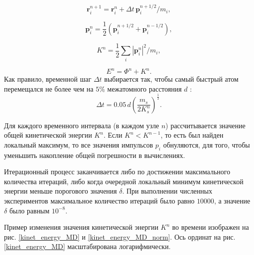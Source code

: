 \begin{equation}
\label{LF2}
\mathbf{r}^{n+1}_i = \mathbf{r}^{n}_i + \Delta t \, \mathbf{p}^{n+1/2}_i/m_i,
\end{equation}

\begin{equation}
\label{LF3}
\mathbf{p}^{n}_i = \dfrac{1}{2} \left(\mathbf{p}^{n+1/2}_i +
\mathbf{p}^{n-1/2}_i \right),
\end{equation}

\begin{equation}
\label{LF4}
K^n = \dfrac{1}{2} \sum_{i} |\mathbf{p}^{n}_i|^2/m_i,
\end{equation}

\begin{equation}
\label{LF5}
E^n = {\Phi}^n + K^n .
\end{equation}
Как правило, временной шаг $\Delta t$ выбирается так, чтобы самый быстрый атом перемещался не более чем на $5\%$
межатомного расстояния $d$ \cite{Eckstein1991}:
\begin{equation}
\label{LF6}
\Delta t = 0.05 \, d \left( \dfrac{m_s}{2 K_s^n} \right)^{\frac{1}{2}}.
\end{equation}

Для каждого временного интервала (в каждом узле $n$) рассчитывается значение общей кинетической энергии $K^n$.
Если $K^n < K^{n-1}$, то есть был найден локальный максимум,
то все значения импульсов $p_{i}$ обнуляются, для того, чтобы уменьшить накопление общей погрешности в вычислениях.

Итерационный процесс заканчивается либо по достижении максимального количества итераций,
либо когда очередной локальный минимум кинетической энергии меньше порогового значения $\delta$.
При выполнении численных экспериментов максимальное количество итераций было равно $10000$,
а значение $\delta$ было равным $10^{-8}$.

Пример изменения значения кинетической энергии $K^n$ во времени изображен на
рис. \ref{kinet_energy_MD} и \ref{kinet_energy_MD_norm}.
Ось ординат на рис. \ref{kinet_energy_MD} масштабирована логарифмически.

